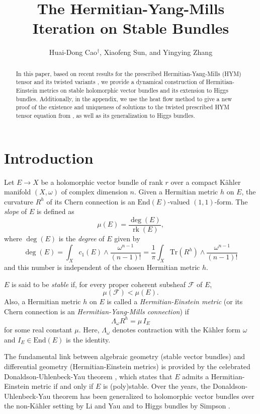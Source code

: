 \documentclass[11pt]{amsart}
\title{The  Hermitian-Yang-Mills Iteration on Stable Bundles}
\author{Huai-Dong Cao$^{\dagger}$, Xiaofeng Sun, and Yingying Zhang}
\numberwithin{equation}{section}
\theoremstyle{remark}
\newcommand{\tr}{\text{Tr}}
\newcommand{\End}{\text{End}}
\begin{document}
\begin{abstract}
In this paper, based on recent results for the prescribed Hermitian-Yang-Mills (HYM) tensor \cite{WYY1} and its twisted variants \cite{WYY3}, we provide a dynamical construction of Hermitian-Einstein metrics on stable holomorphic vector bundles and its extension to Higgs bundles. Additionally, in the appendix, we use the heat flow method to give a new proof of the existence and uniqueness of solutions to the twisted prescribed HYM tensor equation from \cite{WYY3}, as well as its generalization to Higgs bundles.
\end{abstract}

\maketitle


\section{Introduction}\label{s10}

 Let $E\to X$ be a holomorphic vector bundle of rank $r$ over a compact K\"ahler manifold $(X,\omega)$ of complex dimension $n$. Given a Hermitian metric $h$ on $E$, the curvature $R^h$ of its Chern connection is an $\End(E)$-valued $(1,1)$-form.
The {\it slope} of $E $ is defined as
\[
\mu(E)=\frac{\deg(E)}{\operatorname{rk}(E)},
\]
where $\deg(E)$ is the {\it degree} of $E$ given by
\[
\deg(E) = \int_X c_1(E)\wedge
\frac{\omega^{n-1}}{(n-1)!} =\frac{1}{\pi} \int_X \tr (R^h)\wedge\frac{\omega^{n-1}}{(n-1)!}
\]
and this number is independent of the chosen Hermitian metric $h$.


$E$ is said to be {\it stable} if, for every proper coherent subsheaf $\mathcal{F}$ of $E$,
\[
\mu(\mathcal{F})<\mu(E).
\]
Also, a Hermitian metric $h$ on $E$ is called a {\it Hermitian-Einstein metric} (or its Chern connection is an {\it Hermitian-Yang-Mills connection}) if
\begin{equation}\label{5}
\Lambda_\omega R^h =\mu \, I_E
\end{equation}
for some real constant $\mu$. Here, $\Lambda_\omega$ denotes contraction with the K\"ahler form $\omega$ and $I_E\in \End(E)$ is the identity.


The fundamental link between algebraic geometry (stable vector bundles) and differential geometry (Hermitian-Einstein metrics) is provided by the celebrated Donaldson-Uhlenbeck-Yau theorem \cite{sd1, sd2, UY}, which states that $E$ admits a Hermitian-Einstein metric if and only if $E$ is (poly)stable.  Over the years, the Donaldson-Uhlenbeck-Yau theorem has been generalized to holomorphic vector bundles over the non-K\"ahler setting by Li and Yau \cite{LY} and to Higgs bundles by Simpson \cite{sim1988}.
\end{document}
